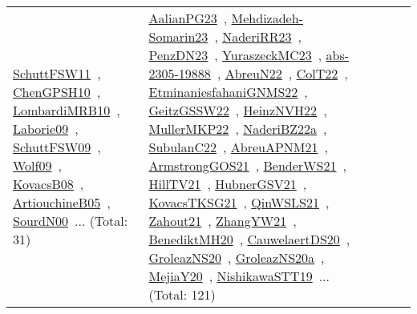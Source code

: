 {\begin{longtable}{lp{3cm}>{\raggedright\arraybackslash}p{6cm}>{\raggedright\arraybackslash}p{6cm}>{\raggedright\arraybackslash}p{8cm}}
\href{../works/SchuttFSW11.pdf}{SchuttFSW11}~\cite{SchuttFSW11}, \href{../works/ChenGPSH10.pdf}{ChenGPSH10}~\cite{ChenGPSH10}, \href{../works/LombardiMRB10.pdf}{LombardiMRB10}~\cite{LombardiMRB10}, \href{../works/Laborie09.pdf}{Laborie09}~\cite{Laborie09}, \href{../works/SchuttFSW09.pdf}{SchuttFSW09}~\cite{SchuttFSW09}, \href{../works/Wolf09.pdf}{Wolf09}~\cite{Wolf09}, \href{../works/KovacsB08.pdf}{KovacsB08}~\cite{KovacsB08}, \href{../works/ArtiouchineB05.pdf}{ArtiouchineB05}~\cite{ArtiouchineB05}, \href{../works/SourdN00.pdf}{SourdN00}~\cite{SourdN00}... (Total: 31) & \href{../works/AalianPG23.pdf}{AalianPG23}~\cite{AalianPG23}, \href{../works/Mehdizadeh-Somarin23.pdf}{Mehdizadeh-Somarin23}~\cite{Mehdizadeh-Somarin23}, \href{../works/NaderiRR23.pdf}{NaderiRR23}~\cite{NaderiRR23}, \href{../works/PenzDN23.pdf}{PenzDN23}~\cite{PenzDN23}, \href{../works/YuraszeckMC23.pdf}{YuraszeckMC23}~\cite{YuraszeckMC23}, \href{../works/abs-2305-19888.pdf}{abs-2305-19888}~\cite{abs-2305-19888}, \href{../works/AbreuN22.pdf}{AbreuN22}~\cite{AbreuN22}, \href{../works/ColT22.pdf}{ColT22}~\cite{ColT22}, \href{../works/EtminaniesfahaniGNMS22.pdf}{EtminaniesfahaniGNMS22}~\cite{EtminaniesfahaniGNMS22}, \href{../works/GeitzGSSW22.pdf}{GeitzGSSW22}~\cite{GeitzGSSW22}, \href{../works/HeinzNVH22.pdf}{HeinzNVH22}~\cite{HeinzNVH22}, \href{../works/MullerMKP22.pdf}{MullerMKP22}~\cite{MullerMKP22}, \href{../works/NaderiBZ22a.pdf}{NaderiBZ22a}~\cite{NaderiBZ22a}, \href{../works/SubulanC22.pdf}{SubulanC22}~\cite{SubulanC22}, \href{../works/AbreuAPNM21.pdf}{AbreuAPNM21}~\cite{AbreuAPNM21}, \href{../works/ArmstrongGOS21.pdf}{ArmstrongGOS21}~\cite{ArmstrongGOS21}, \href{../works/BenderWS21.pdf}{BenderWS21}~\cite{BenderWS21}, \href{../works/HillTV21.pdf}{HillTV21}~\cite{HillTV21}, \href{../works/HubnerGSV21.pdf}{HubnerGSV21}~\cite{HubnerGSV21}, \href{../works/KovacsTKSG21.pdf}{KovacsTKSG21}~\cite{KovacsTKSG21}, \href{../works/QinWSLS21.pdf}{QinWSLS21}~\cite{QinWSLS21}, \href{../works/Zahout21.pdf}{Zahout21}~\cite{Zahout21}, \href{../works/ZhangYW21.pdf}{ZhangYW21}~\cite{ZhangYW21}, \href{../works/BenediktMH20.pdf}{BenediktMH20}~\cite{BenediktMH20}, \href{../works/CauwelaertDS20.pdf}{CauwelaertDS20}~\cite{CauwelaertDS20}, \href{../works/GroleazNS20.pdf}{GroleazNS20}~\cite{GroleazNS20}, \href{../works/GroleazNS20a.pdf}{GroleazNS20a}~\cite{GroleazNS20a}, \href{../works/MejiaY20.pdf}{MejiaY20}~\cite{MejiaY20}, \href{../works/NishikawaSTT19.pdf}{NishikawaSTT19}~\cite{NishikawaSTT19}... (Total: 121)\\

\end{longtable}}
